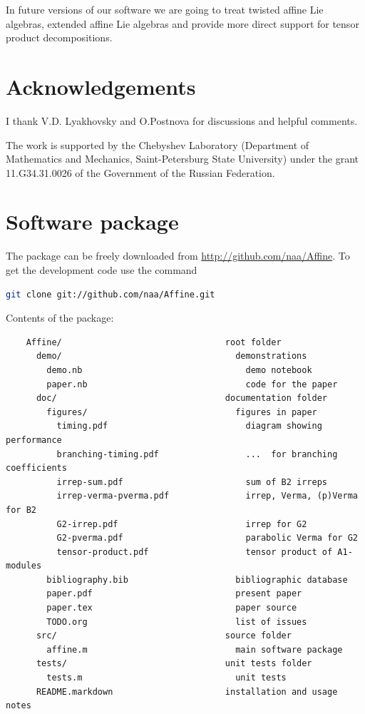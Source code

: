In future versions of our software we are going to treat twisted affine Lie algebras, extended affine Lie algebras and provide more direct support for tensor product decompositions. 

\section*{Acknowledgements}
\label{sec:acknowledgements}
I thank V.D. Lyakhovsky and O.Postnova for discussions and helpful comments.

The work is supported by the Chebyshev Laboratory
(Department of Mathematics and Mechanics, Saint-Petersburg State
University) under the grant 11.G34.31.0026 of the Government of the
Russian Federation.



\section{Software package}
\label{package}
The package can be freely downloaded from \url{http://github.com/naa/Affine}. To get the development code use the command
\begin{lstlisting}[language=bash]
 git clone git://github.com/naa/Affine.git
\end{lstlisting}

Contents of the package:
\begin{verbatim}
    Affine/                                root folder
      demo/                                  demonstrations
        demo.nb                                demo notebook
        paper.nb                               code for the paper
      doc/                                 documentation folder
        figures/                             figures in paper 
          timing.pdf                           diagram showing performance
          branching-timing.pdf                 ...  for branching coefficients  
          irrep-sum.pdf                        sum of B2 irreps
          irrep-verma-pverma.pdf               irrep, Verma, (p)Verma for B2
          G2-irrep.pdf                         irrep for G2
          G2-pverma.pdf                        parabolic Verma for G2
          tensor-product.pdf                   tensor product of A1-modules
        bibliography.bib                     bibliographic database
        paper.pdf                            present paper
        paper.tex                            paper source
        TODO.org                             list of issues
      src/                                 source folder
        affine.m                             main software package
      tests/                               unit tests folder
        tests.m                              unit tests
      README.markdown                      installation and usage notes
\end{verbatim}


